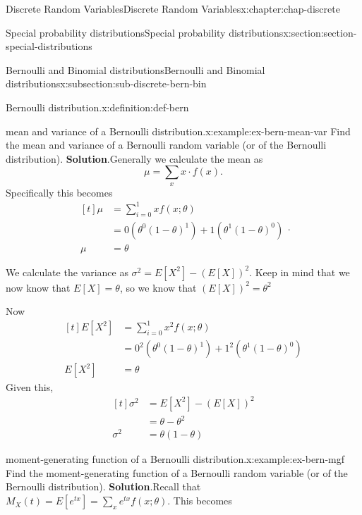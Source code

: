 \documentclass[oneside,10pt,]{book}
\newcommand{\blocktitlefont}{\relax}
\numberwithin{equation}{section}
\newcommand{\amp}{&}
\begin{document}
\begin{chapterptx}{Discrete Random Variables}{}{Discrete Random Variables}{}{}{x:chapter:chap-discrete}
\begin{sectionptx}{Special probability distributions}{}{Special probability distributions}{}{}{x:section:section-special-distributions}
\begin{subsectionptx}{Bernoulli and Binomial distributions}{}{Bernoulli and Binomial distributions}{}{}{x:subsection:sub-discrete-bern-bin}
\begin{definition}{Bernoulli distribution.}{x:definition:def-bern}
%
\end{definition}
\begin{example}{mean and variance of a Bernoulli distribution.}{x:example:ex-bern-mean-var}%
Find the mean and variance of a Bernoulli random variable (or of the Bernoulli distribution).%
\textbf{\blocktitlefont Solution}.\quad{}Generally we calculate the mean as%
\begin{equation*}
\mu = \sum_x x\cdot f(x)\text{.}
\end{equation*}
Specifically this becomes%
\begin{equation*}
\begin{aligned}[t]
\mu \amp = \sum_{i=0}^1 x f(x; \theta)\\
\amp = 0\left(\theta^0(1-\theta)^1\right) +
1\left(\theta^1(1-\theta)^0\right)\\
\mu \amp = \theta
\end{aligned}\text{.}
\end{equation*}
%
\par
We calculate the variance as \(\sigma^2 =
E[X^2]-\left(E[X]\right)^2\). Keep in mind that we now know that \(E[X] = \theta\), so we know that \(\left(E[X]\right)^2 =
\theta^2\)%
\par
Now%
\begin{equation*}
\begin{aligned}[t]
E[X^2] \amp = \sum_{i=0}^1 x^2 f(x; \theta)\\
\amp = 0^2\left(\theta^0(1-\theta)^1\right) +
1^2\left(\theta^1(1-\theta)^0\right)\\
E[X^2] \amp = \theta
\end{aligned}
\end{equation*}
Given this,%
\begin{equation*}
\begin{aligned}[t]
\sigma^2 \amp = E[X^2]-\left(E[X]\right)^2\\
\amp = \theta - \theta^2 \\
\sigma^2 \amp = \theta(1-\theta)
\end{aligned}
\end{equation*}
%
\end{example}
\begin{example}{moment-generating function of a Bernoulli distribution.}{x:example:ex-bern-mgf}%
Find the moment-generating function of a Bernoulli random variable (or of the Bernoulli distribution).%
\textbf{\blocktitlefont Solution}.\quad{}Recall that \(\displaystyle M_X(t) = E[e^{tx}] = \sum_x e^{tx} f(x;
\theta)\). This becomes%
\begin{equation*}

\end{equation*}
\end{example}
\end{subsectionptx}
\end{sectionptx}
\end{chapterptx}
\end{document}
